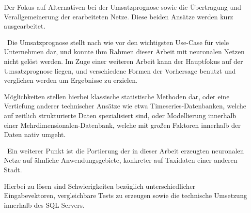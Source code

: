 Der Fokus auf Alternativen bei der Umsatzprognose sowie die Übertragung und Verallgemeinerung der erarbeiteten Netze. Diese beiden Ansätze werden kurz ausgearbeitet. 

~\newline Die Umsatzprognose stellt nach wie vor den wichtigsten Use-Case für viele Unternehmen dar, und konnte ihm Rahmen dieser Arbeit mit neuronalen Netzen nicht gelöst werden. Im Zuge einer weiteren Arbeit kann der Hauptfokus auf der Umsatzprognose liegen, und verschiedene Formen der Vorhersage benutzt und verglichen werden um Ergebnisse zu erzielen. 

Möglichkeiten stellen hierbei klassische statistische Methoden dar, oder eine Vertiefung anderer technischer Ansätze wie etwa Timeseries-Datenbanken, welche auf zeitlich strukturierte Daten spezialisiert sind, oder Modellierung innerhalb einer Mehrdimensionalen-Datenbank, welche mit großen Faktoren innerhalb der Daten nativ umgeht.

~\newline Ein weiterer Punkt ist die Portierung der in dieser Arbeit erzeugten neuronalen Netze auf ähnliche Anwendungsgebiete, konkreter auf Taxidaten einer anderen Stadt. 

Hierbei zu lösen sind Schwierigkeiten bezüglich unterschiedlicher Eingabevektoren, vergleichbare Tests zu erzeugen sowie die technische Umsetzung innerhalb des SQL-Servers.  